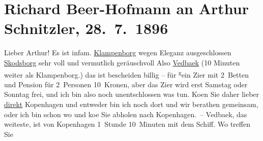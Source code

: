 

         
         \renewcommand{\erwaehntePersonen}{Personen: Georg Brandes, Paul Goldmann}
         \renewcommand{\erwaehnteOrte}{Orte: Hotel König von Dänemark, Klampenborg, Kopenhagen, Skodsborg, Vedbæk}
         \renewcommand{\erwaehnteWerke}{}
               \section[Richard Beer-Hofmann an Arthur Schnitzler, 28. 7. 1896]{ Richard Beer-Hofmann an Arthur Schnitzler, 28. 7. 1896}\nopagebreak{}\rehead{ }\begin{ledgroupsized}[t]{13cm}\normalsize\beginnumbering \toendnotes[C]{\smallbreak\pagebreak[2]} 
\pstart
           \noindent{}{\pb}Lieber Arthur! Es
               ist infam.\pend
           \pstart
           \uline{Klampenborg} wegen Eleganz ausgeschlossen\pend
           \pstart
           \uline{Skodsborg} sehr voll und vermutlich geräuschvoll\pend
           \pstart
           Also \uline{Vedbaek} (10 Minuten weiter als Klampenborg.)\pend
           \pstart
           das ist bescheiden billig – für \substVorne{}\textsuperscript{g}\substDazwischen{}e\substHinten{}in Zi{\geminationm}er mit 2 Betten und Pension für 2 Personen
               10 Kronen, aber das Zi{\geminationm}er wird erst {\pb}Samstag oder Sonntag frei, und ich bin also noch
               unentschlossen was tun. Ko{\geminationm}en Sie daher lieber \uline{direkt}{ }Kopenhagen und entweder bin ich noch dort und wir
               berathen gemeinsam, oder ich bin schon wo und ko{\geminationm}e Sie
               abholen nach Kopenhagen. –\pend
           \pstart
           {\pb}Vedbaek, das weiteste, ist von Kopenhagen 1 Stunde 10 Minuten mit dem Schiff. Wo treffen Sie

\end{ledgroupsized}
